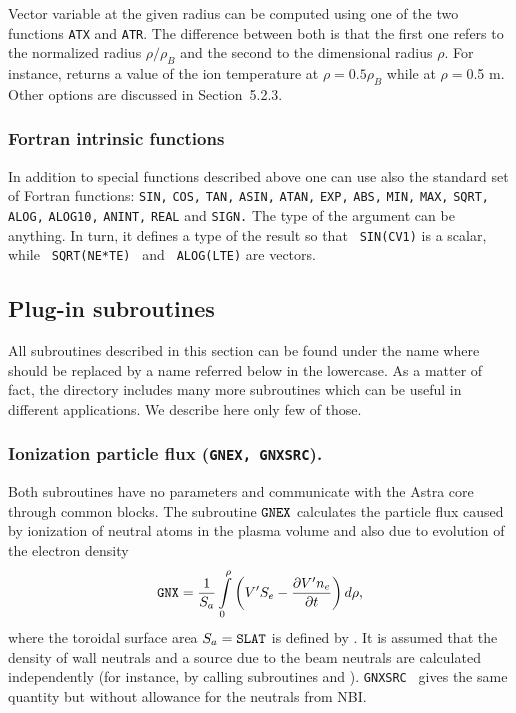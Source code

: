 Vector variable at the given radius can be computed using one of the two
functions {\tt ATX} and {\tt ATR}.
The difference between both is that the first one refers to the
normalized radius $\rho/\rho_B$ and the second to the dimensional radius
$\rho.$ 
For instance,  returns a value of the ion temperature
at $\rho=0.5\rho_B$ while  at $\rho=$0.5 m. 
Other options are discussed in Section~5.2.3.

\subsubsection{Fortran intrinsic functions}

In addition to special functions described above one can use also the
standard set of Fortran functions:
{\tt SIN,} {\tt COS,} {\tt TAN,} {\tt ASIN,} {\tt ATAN,} {\tt EXP,} 
{\tt ABS,} {\tt MIN,} {\tt MAX,} {\tt SQRT,} {\tt ALOG,} {\tt ALOG10,}  
{\tt ANINT,} {\tt REAL} and {\tt SIGN.}
The type of the argument can be anything.
In turn, it defines a type of the result so that {\tt~SIN(CV1)} is a
scalar, while {\tt~SQRT(NE*TE)~} and {\tt~ALOG(LTE)} are vectors. 

\subsection{Plug-in subroutines}

All subroutines described in this section can be found under the name 
 where  should be replaced by a name
referred below in the lowercase. 
As a matter of fact, the directory  includes many more
subroutines which can be useful in different applications.
We describe here only few of those.


\subsubsection{Ionization particle flux ({\tt GNEX, GNXSRC}).}

Both subroutines have no parameters and communicate with the Astra core
through common blocks.
The subroutine ${\tt GNEX}$ calculates the particle flux  caused
by ionization of neutral atoms in the plasma volume and also due to
evolution of the electron density 
$$
{\tt GNX}
=\frac{1}{S_a}\int\limits_0^\rho\left(V'S_e-\displaystyle{\partial V'n_e\over\partial t}\right)d\rho
,$$
where the toroidal surface area $S_a=\tt SLAT$ is defined by .
It is assumed that the density of wall neutrals  and a source
due to the beam neutrals  are calculated 
independently (for instance, by calling subroutines  and
). 
{\tt GNXSRC~} gives the same quantity but without allowance for the
neutrals from NBI. 

